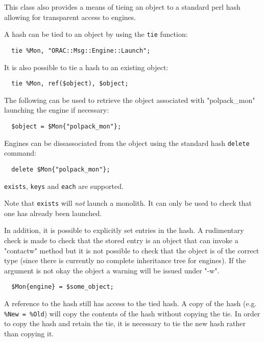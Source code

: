 This class also provides a means of tieing an object to
a standard perl hash allowing for transparent access to
engines.



A hash can be tied to an object by using the \texttt{tie} function:

\begin{verbatim}
  tie %Mon, "ORAC::Msg::Engine::Launch";
\end{verbatim}


It is also possible to tie a hash to an existing object:

\begin{verbatim}
  tie %Mon, ref($object), $object;
\end{verbatim}


The following can be used to retrieve the object associated with
"polpack\_mon" launching the engine if necessary:

\begin{verbatim}
  $object = $Mon{"polpack_mon"};
\end{verbatim}


Engines can be dissassociated from the object using the
standard hash \texttt{delete} command:

\begin{verbatim}
  delete $Mon{"polpack_mon"};
\end{verbatim}


\texttt{exists}, \texttt{keys} and \texttt{each} are supported.



Note that \texttt{exists} will \textit{not} launch a monolith. It can only
be used to check that one has already been launched.



In addition, it is possible to explicitly set entries in the hash. A
rudimentary check is made to check that the stored entry is an object
that can invoke a "contactw" method but it is not possible to check
that the object is of the correct type (since there is currently no
complete inheritance tree for engines). If the argument is not okay
the object a warning will be issued under "-w".

\begin{verbatim}
  $Mon{engine} = $some_object;
\end{verbatim}


A reference to the hash still has access to the tied hash.  A copy of
the hash (e.g. \texttt{\%New = \%Old}) will copy the contents of the hash
without copying the tie.  In order to copy the hash and retain the
tie, it is necessary to tie the new hash rather than copying it.

